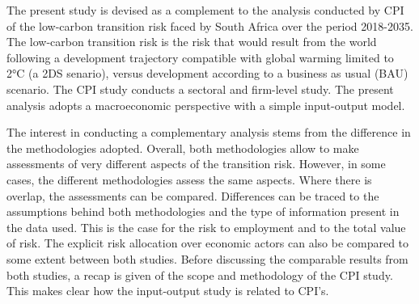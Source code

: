 \documentclass[12pt,english]{article}
\begin{document}
The present study is devised as a complement to the analysis conducted by CPI of the low-carbon transition risk faced by South Africa over the period 2018-2035. The low-carbon transition risk is the risk that would result from the world following a development trajectory compatible with global warming limited to 2°C (a 2DS senario), versus development according to a business as usual (BAU) scenario. The CPI study conducts a sectoral and firm-level study. The present analysis adopts a macroeconomic perspective with a simple input-output model.

The interest in %
conducting a complementary analysis stems from the difference in the methodologies adopted. Overall, both methodologies allow to make assessments of very different aspects of the transition risk. However, in some cases, the different methodologies assess the same aspects. %
Where there is overlap, the assessments can be compared. Differences can be traced to the assumptions behind both methodologies and the type of information present in the data used. This is the case for the risk %
to employment and to the total value of risk. The explicit risk allocation over economic actors can also be compared to some extent between both studies. %
Before discussing the comparable results from both studies, a recap is given of the scope and methodology of the CPI study. This makes clear how the input-output study is related to CPI's. 
\end{document}
